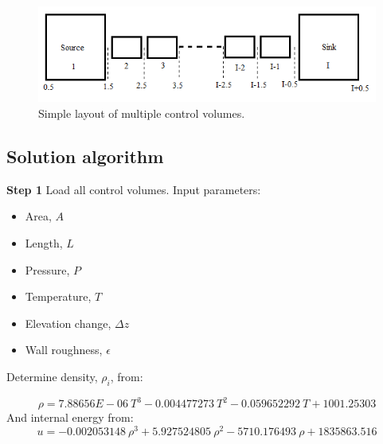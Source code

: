 \documentclass[11pt,letterpaper,titlepage]{article}
\begin{document}
	\begin{center}
		\begin{minipage}[c]{0.85\textwidth}
	
			\begin{figure}[H]
			
				\includegraphics[width=6in]{ZZZ_SimpleSystem.png}
				\caption{Simple layout of multiple control volumes.}
				\label{figure:ZZZ_SimpleSystem}
			\end{figure}
		\end{minipage}
	\end{center}
\vspace{0.5cm}










\newpage
\subsection{Solution algorithm}

\textbf{Step 1}\newline
Load all control volumes. Input parameters:
\begin{itemize}
\item Area, $A$
\item Length, $L$
\item Pressure, $P$
\item Temperature, $T$
\item Elevation change, $\Delta z$
\item Wall roughness, $\epsilon$
\end{itemize}
\vspace{0.25cm}
Determine density, $\rho_i$, from:

\begin{equation*}
\rho=7.88656E-06 \ T^3-0.004477273 \ T^2-0.059652292 \ T+1001.25303
\end{equation*}
\newline
And internal energy from:
\begin{equation*}
u=-0.002053148 \ \rho^3+5.927524805 \ \rho^2-5710.176493 \ \rho+1835863.516 
\end{equation*}
\end{document}
